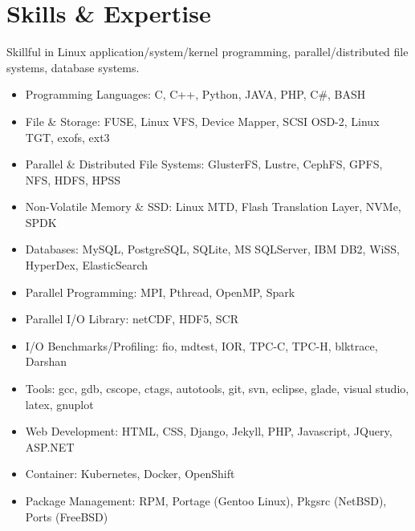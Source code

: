 \section{Skills \& Expertise}
Skillful in Linux application/system/kernel programming, parallel/distributed
file systems, database systems.
\begin{itemize}
\item {Programming Languages}: C, C++, Python, JAVA, PHP, C\#, BASH
\item {File \& Storage}: FUSE, Linux VFS, Device Mapper, SCSI OSD-2, Linux TGT, exofs, ext3
\item {Parallel \& Distributed File Systems}: GlusterFS, Lustre, CephFS, GPFS, NFS, HDFS, HPSS
\item {Non-Volatile Memory \& SSD}: Linux MTD, Flash Translation Layer, NVMe, SPDK
\item {Databases}: MySQL, PostgreSQL, SQLite, MS SQLServer, IBM DB2, WiSS, HyperDex, ElasticSearch
\item {Parallel Programming}: MPI, Pthread, OpenMP, Spark
\item {Parallel I/O Library}: netCDF, HDF5, SCR
\item {I/O Benchmarks/Profiling}: fio, mdtest, IOR, TPC-C, TPC-H, blktrace, Darshan
\item {Tools}: gcc, gdb, cscope, ctags, autotools, git, svn, eclipse, glade, visual studio, latex, gnuplot
\item {Web Development}: HTML, CSS, Django, Jekyll, PHP, Javascript, JQuery, ASP.NET
\item {Container}: Kubernetes, Docker, OpenShift
\item {Package Management}: RPM, Portage (Gentoo Linux), Pkgsrc (NetBSD), Ports (FreeBSD)
\end{itemize}

